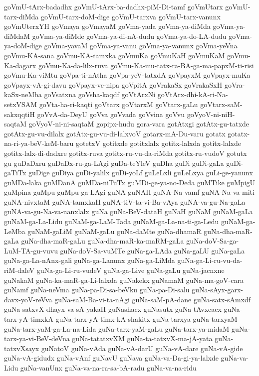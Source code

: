 {goVmU-tArx-badadhx
goVmU-tArx-ba-dadhx-piM-Di-tamf
goVmUtarx
goVmU-tarx-diMda
goVmU-tarx-doM-dige
goVmU-tarxva
goVmU-tarx-vanunx
goVmUterxYH
goVmaya
goVmayaM
goVma-yada
goVma-ya-diMda
goVma-ya-diMdaM
goVma-ya-diMde
goVma-ya-di-nA-dudu
goVma-ya-do-LA-dudu
goVma-ya-doM-dige
goVma-yavaM
goVma-ya-vanu
goVma-ya-vanunx
goVma-yeVna
goVmu-KA-sana
goVmu-KA-tamxka
goVmuKa
goVmuKaH
goVmuKaM
goVmu-Ka-dagarx
goVmu-Ka-da-lilx-ruva
goVmu-Ka-mu-tatx-ra-BA-ga-ma-papxM-ti-risi
goVmu-Ka-viMtu
goVpa-ti-nAtha
goVpa-yeV-tatxdA
goVpayxM
goVpayx-muKa
goVpayx-vA-gi-davu
goVpayx-ve-nipa
goVpitA
goVrakaSx
goVrakaSxH
goVra-kaSx-neMba
goVsatxna
goVsha-kaqdf
goVtArxNi
goVtArx-dhi-kA-ri-Na-setxVSAM
goVta-ha-ri-kaqti
goVtarx
goVtarxM
goVtarx-gaLu
goVtarx-saM-sakxqqtiH
goVvA-da-DeyU
goVva
goVvada
goVvina
goVvu
goVyoV-ni-niH-saqtaM
goVyoV-ni-ni-saqtaM
gopipx-hudu
gora-vara
gotAtxgi
gotAtx-gu-tatxde
gotAtx-gu-vu-dilalx
gotAtx-gu-vu-di-lalxvoV
gotarx-mA-Du-varu
gotatx
gotatx-na-ri-ya-beV-keM-baru
gotetxV
gotitxde
gotitxlalx
gotitx-lalxda
gotitx-lalxde
gotitx-lalx-di-dadxre
gotitx-ruva
gotitx-ru-vu-da-riMda
gotitx-ru-vudoV
gotutx
gu
guDaDxru
guDaDx-ru-ga-LAgi
guDa-teYleV
guDha
guDi
guDi-gaLa
guDi-gaTiTx
guDige
guDiya
guDi-yalilx
guDi-yoLf
guLeLxli
guLeLxya
guLi-ge-yanunx
guMDa-laka
guMDanA
guMDa-niTuTx
guMDi-ge-ya-no-Deda
guMTike
guMpigU
guMpina
guMpu
guMpu-ga-LAgi
guNA
guNAH
guNA-Na-vamf
guNA-Na-va-miti
guNA-nivxtaM
guNA-tamxkaH
guNA-tiV-ta-vi-Ba-vAya
guNA-va-gu-Na-gaLa
guNA-va-gu-Na-va-nanxlalx
guNa
guNa-BeV-dataH
guNaH
guNaM
guNaM-gaLa
guNaM-ga-La-Lidu
guNaM-ga-LaM-Tada
guNaM-ga-La-na-ti-ga-Ledu
guNaM-ga-LeMba
guNaM-gaLiM
guNaM-gaLu
guNa-daMte
guNa-dhamaR
guNa-dha-maR-gaLa
guNa-dha-maR-gaLu
guNa-dha-maR-ka-maRM-gaLa
guNa-doV-Sa-ga-LuM-TA-gu-vuvu
guNa-doV-Sa-vuMTe
guNa-ga-LAda
guNa-gaLU
guNa-gaLa
guNa-ga-La-nAnx-gali
guNa-ga-Lanunx
guNa-ga-LiMda
guNa-ga-Li-ru-vu-da-riM-daleV
guNa-ga-Li-ru-vudeV
guNa-ga-Live
guNa-gaLu
guNa-jacnxne
guNakaM
guNa-ka-maR-ga-Li-lalxda
guNakekx
guNamaM
guNa-ma-goV-cara
guNamf
guNa-neVma
guNa-pa-Di-sa-beVku
guNa-pa-Di-salu
guNa-sAyx-garx-davx-yoV-reVva
guNa-saM-Ba-vi-ta-nAgi
guNa-saM-pA-dane
guNa-satx-sAmxdf
guNa-satxvX-dhayx-va-sA-yakaH
guNashacx
guNasutx
guNa-tAvxcacx
guNa-tarx-yA-timxkA
guNa-tarx-yA-timx-kA-shakitx
guNa-tarxya
guNa-tarxyaM
guNa-tarx-yaM-ga-La-na-Lida
guNa-tarx-yaM-gaLu
guNa-tarx-ya-midaM
guNa-tarx-ya-vi-BeV-deVna
guNa-tatatxvXM
guNa-ta-tatxvX-ma-jA-yata
guNa-tatxvXsayx
guNatoV
guNa-vAda
guNa-vA-darU
guNa-vA-dare
guNa-vA-gide
guNa-vA-gidudx
guNa-vAnf
guNavU
guNava
guNa-va-Da-gi-ya-lalxde
guNa-va-Lidu
guNa-vanUnx
guNa-va-na-ra-sa-bA-radu
guNa-va-na-ridu
}
